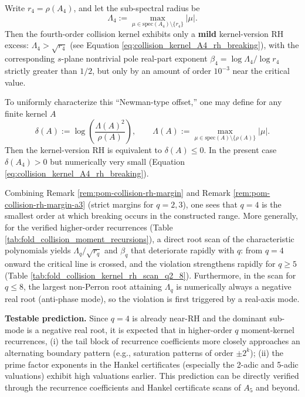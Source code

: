 \begin{remark}\label{rem:pom-collision-rh-break-a4}
Write \(r_4=\rho(A_4)\), and let the sub-spectral radius be
\[
\Lambda_4:=\max_{\mu\in\mathrm{spec}(A_4)\setminus\{r_4\}}|\mu|.
\]
 Then the fourth-order collision kernel exhibits only a \textbf{mild} kernel-version RH excess: \(\Lambda_4>\sqrt{r_4}\) (see Equation \ref{eq:collision_kernel_A4_rh_breaking}), with the corresponding \(s\)-plane nontrivial pole real-part exponent
\(
\beta_4=\log\Lambda_4/\log r_4
\)
 strictly greater than \(1/2\), but only by an amount of order \(10^{-3}\) near the critical value.
\par
To uniformly characterize this ``Newman-type offset,'' one may define for any finite kernel \(A\)
\[
\delta(A):=\log\!\left(\frac{\Lambda(A)^2}{\rho(A)}\right),
\qquad
\Lambda(A):=\max_{\mu\in\mathrm{spec}(A)\setminus\{\rho(A)\}}|\mu|.
\]
Then the kernel-version RH is equivalent to \(\delta(A)\le 0\). In the present case \(\delta(A_4)>0\) but numerically very small (Equation \ref{eq:collision_kernel_A4_rh_breaking}).
\par
Combining Remark \ref{rem:pom-collision-rh-margin} and Remark \ref{rem:pom-collision-rh-margin-a3} (strict margins for \(q=2,3\)), one sees that \(q=4\) is the smallest order at which breaking occurs in the constructed range.
More generally, for the verified higher-order recurrences (Table \ref{tab:fold_collision_moment_recursions}), a direct root scan of the characteristic polynomials yields
\(\Lambda_q/\sqrt{r_q}\) and \(\beta_q\) that deteriorate rapidly with \(q\): from \(q=4\) onward the critical line is crossed, and the violation strengthens rapidly for \(q\ge 5\) (Table \ref{tab:fold_collision_kernel_rh_scan_q2_8}).
Furthermore, in the scan for \(q\le 8\), the largest non-Perron root attaining \(\Lambda_q\) is numerically always a negative real root (anti-phase mode), so the violation is first triggered by a real-axis mode.
\par
\textbf{Testable prediction.} Since \(q=4\) is already near-RH and the dominant sub-mode is a negative real root, it is expected that in higher-order \(q\) moment-kernel recurrences,
(i) the tail block of recurrence coefficients more closely approaches an alternating boundary pattern (e.g., saturation patterns of order \(\pm 2^k\));
(ii) the prime factor exponents in the Hankel certificates (especially the 2-adic and 5-adic valuations) exhibit high valuations earlier.
This prediction can be directly verified through the recurrence coefficients and Hankel certificate scans of \(A_5\) and beyond.
\end{remark}

